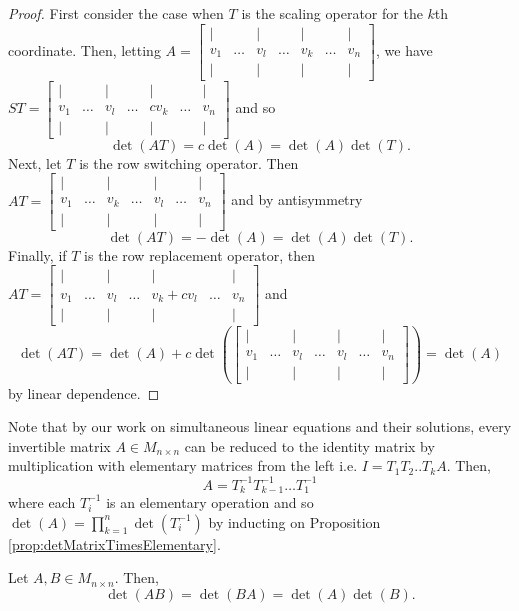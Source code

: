 \begin{proof}
First consider the case when $T$ is the scaling operator for the
$k$th coordinate. Then, letting $A=\left[\begin{array}{ccccccc}
| &  & | &  & | &  & |\\
v_{1} & \ldots & v_{l} & \ldots & v_{k} & \ldots & v_{n}\\
| &  & | &  & | &  & |
\end{array}\right]$, we have $ST=\left[\begin{array}{ccccccc}
| &  & | &  & | &  & |\\
v_{1} & \ldots & v_{l} & \ldots & cv_{k} & \ldots & v_{n}\\
| &  & | &  & | &  & |
\end{array}\right]$ and so 
\[
\det\left(AT\right)=c\det\left(A\right)=\det\left(A\right)\det\left(T\right).
\]
Next, let $T$ is the row switching operator. Then $AT=\left[\begin{array}{ccccccc}
| &  & | &  & | &  & |\\
v_{1} & \ldots & v_{k} & \ldots & v_{l} & \ldots & v_{n}\\
| &  & | &  & | &  & |
\end{array}\right]$ and by antisymmetry
\[
\det\left(AT\right)=-\det\left(A\right)=\det\left(A\right)\det\left(T\right).
\]
Finally, if $T$ is the row replacement operator, then $AT=\left[\begin{array}{ccccccc}
| &  & | &  & | &  & |\\
v_{1} & \ldots & v_{l} & \ldots & v_{k}+cv_{l} & \ldots & v_{n}\\
| &  & | &  & | &  & |
\end{array}\right]$ and 
\[
\det\left(AT\right)=\det\left(A\right)+c\det\left(\left[\begin{array}{ccccccc}
| &  & | &  & | &  & |\\
v_{1} & \ldots & v_{l} & \ldots & v_{l} & \ldots & v_{n}\\
| &  & | &  & | &  & |
\end{array}\right]\right)=\det\left(A\right)
\]
 by linear dependence.
\end{proof}
Note that by our work on simultaneous linear equations and their solutions,
every invertible matrix $A\in M_{n\times n}$ can be reduced to the
identity matrix by multiplication with elementary matrices from the
left i.e. $I=T_{1}T_{2}..T_{k}A.$ Then,
\[
A=T_{k}^{-1}T_{k-1}^{-1}\ldots T_{1}^{-1}
\]
where each $T_{i}^{-1}$ is an elementary operation and so $\det\left(A\right)=\prod_{k=1}^{n}\det\left(T_{i}^{-1}\right)$
by inducting on Proposition \ref{prop:detMatrixTimesElementary}.
\begin{prop}
\label{prop:detProduct}Let $A,B\in M_{n\times n}$. Then, 
\[
\det\left(AB\right)=\det\left(BA\right)=\det\left(A\right)\det\left(B\right).
\]
\end{prop}

